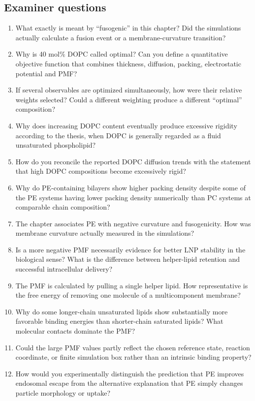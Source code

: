 \documentclass[11pt,a4paper]{article}
\begin{document}
\subsection*{Examiner questions}

\begin{enumerate}[leftmargin=*]
\item What exactly is meant by ``fusogenic'' in this chapter? Did the simulations actually calculate a fusion event or a membrane-curvature transition?
\item Why is 40 mol\% DOPC called optimal? Can you define a quantitative objective function that combines thickness, diffusion, packing, electrostatic potential and PMF?
\item If several observables are optimized simultaneously, how were their relative weights selected? Could a different weighting produce a different ``optimal'' composition?
\item Why does increasing DOPC content eventually produce excessive rigidity according to the thesis, when DOPC is generally regarded as a fluid unsaturated phospholipid?
\item How do you reconcile the reported DOPC diffusion trends with the statement that high DOPC compositions become excessively rigid?
\item Why do PE-containing bilayers show higher packing density despite some of the PE systems having lower packing density numerically than PC systems at comparable chain composition?
\item The chapter associates PE with negative curvature and fusogenicity. How was membrane curvature actually measured in the simulations?
\item Is a more negative PMF necessarily evidence for better LNP stability in the biological sense? What is the difference between helper-lipid retention and successful intracellular delivery?
\item The PMF is calculated by pulling a single helper lipid. How representative is the free energy of removing one molecule of a multicomponent membrane?
\item Why do some longer-chain unsaturated lipids show substantially more favorable binding energies than shorter-chain saturated lipids? What molecular contacts dominate the PMF?
\item Could the large PMF values partly reflect the chosen reference state, reaction coordinate, or finite simulation box rather than an intrinsic binding property?
\item How would you experimentally distinguish the prediction that PE improves endosomal escape from the alternative explanation that PE simply changes particle morphology or uptake?
\end{enumerate}
\end{document}
